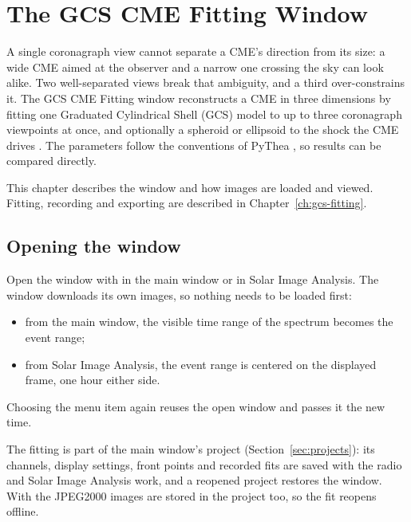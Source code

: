 \chapter{The GCS CME Fitting Window}
\label{ch:gcs-window}

A single coronagraph view cannot separate a CME's direction from its size: a wide CME aimed
at the observer and a narrow one crossing the sky can look alike. Two well-separated views
break that ambiguity, and a third over-constrains it. The GCS CME Fitting window reconstructs
a CME in three dimensions by fitting one Graduated Cylindrical Shell (GCS) model
\parencite{thernisien2006,thernisien2011} to up to three coronagraph viewpoints at once, and
optionally a spheroid or ellipsoid to the shock the CME drives
\parencite{kouloumvakos2019,kwon2014}. The parameters follow the conventions of PyThea
\parencite{kouloumvakos2022}, so results can be compared directly.

This chapter describes the window and how images are loaded and viewed. Fitting, recording
and exporting are described in Chapter~\ref{ch:gcs-fitting}.

\section{Opening the window}

Open the window with  in the main window or in Solar Image
Analysis. The window downloads its own images, so nothing needs to be loaded first:
\begin{itemize}
  \item from the main window, the visible time range of the spectrum becomes the event range;
  \item from Solar Image Analysis, the event range is centered on the displayed frame, one hour
    either side.
\end{itemize}
Choosing the menu item again reuses the open window and passes it the new time.

The fitting is part of the main window's project (Section~\ref{sec:projects}): its channels,
display settings, front points and recorded fits are saved with the radio and Solar Image
Analysis work, and a reopened project restores the window. With  the JPEG2000
images are stored in the project too, so the fit reopens offline.

